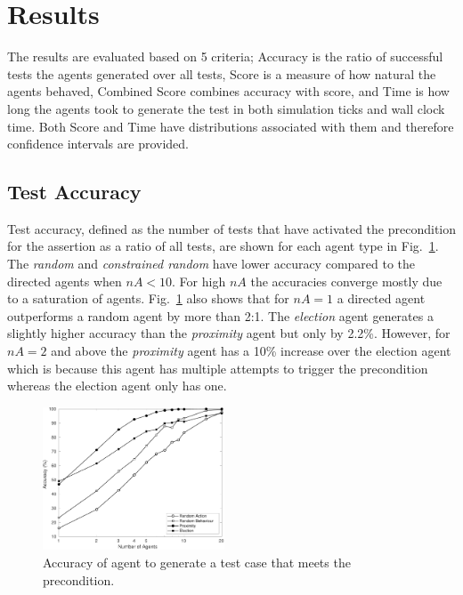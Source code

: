 \documentclass[letterpaper, 10 pt, journal, twoside]{IEEEtran}
\begin{document}
\section{Results}\label{s:results}
The results are evaluated based on 5 criteria; Accuracy is the ratio of successful tests the agents generated over all tests, Score is a measure of how natural the agents behaved, Combined Score combines accuracy with score, and Time is how long the agents took to generate the test in both simulation ticks and wall clock time. Both Score and Time have distributions associated with them and therefore confidence intervals are provided.



\subsection{Test Accuracy}
Test accuracy, defined as the number of tests that have activated the precondition for the assertion as a ratio of all tests, are shown for each agent type in Fig.~\ref{Accuracy}. The \textit{random} and \textit{constrained random} have lower accuracy compared to the directed agents when $nA<10$. For high $nA$ the accuracies converge mostly due to a saturation of agents.
%
Fig.~\ref{Accuracy} also shows that for $nA=1$ a directed agent outperforms a random agent by more than 2:1. The \textit{election} agent generates a slightly higher accuracy than the \textit{proximity} agent but only by 2.2\%. However, for $nA=2$ and above the \textit{proximity} agent has a 10\% increase over the election agent which is because this agent has multiple attempts to trigger the precondition whereas the election agent only has one.


\begin{figure}[!t]
	\centering
\includegraphics[width=0.48\textwidth]{Accuracy.pdf}
	\caption{Accuracy of agent to generate a test case that meets the precondition.}
	\label{Accuracy}
\end{figure}
\end{document}
